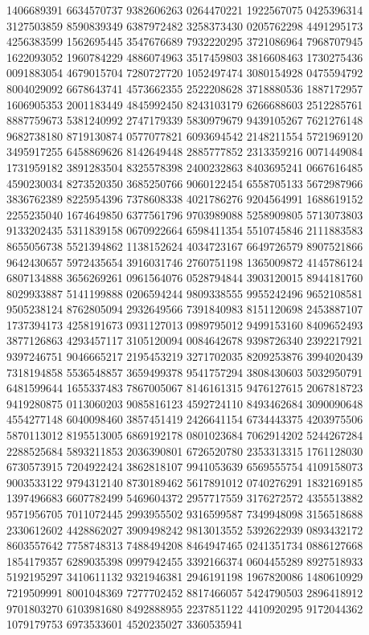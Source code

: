 {{1406689391 6634570737 9382606263 0264470221 1922567075 0425396314 3127503859
8590839349 6387972482 3258373430 0205762298 4491295173 4256383599 1562695445
3547676689 7932220295 3721086964 7968707945 1622093052 1960784229 4886074963
3517459803 3816608463 1730275436 0091883054 4679015704 7280727720 1052497474
3080154928 0475594792 8004029092 6678643741 4573662355 2522208628 3718880536
1887172957 1606905353 2001183449 4845992450 8243103179 6266688603 2512285761
8887759673 5381240992 2747179339 5830979679 9439105267 7621276148 9682738180
8719130874 0577077821 6093694542 2148211554 5721969120 3495917255 6458869626
8142649448 2885777852 2313359216 0071449084 1731959182 3891283504 8325578398
2400232863 8403695241 0667616485 4590230034 8273520350 3685250766 9060122454
6558705133 5672987966 3836762389 8225954396 7378608338 4021786276 9204564991
1688619152 2255235040 1674649850 6377561796 9703989088 5258909805 5713073803
9133202435 5311839158 0670922664 6598411354 5510745846 2111883583 8655056738
5521394862 1138152624 4034723167 6649726579 8907521866 9642430657 5972435654
3916031746 2760751198 1365009872 4145786124 6807134888 3656269261 0961564076
0528794844 3903120015 8944181760 8029933887 5141199888 0206594244 9809338555
9955242496 9652108581 9505238124 8762805094 2932649566 7391840983 8151120698
2453887107 1737394173 4258191673 0931127013 0989795012 9499153160 8409652493
3877126863 4293457117 3105120094 0084642678 9398726340 2392217921 9397246751
9046665217 2195453219 3271702035 8209253876 3994020439 7318194858 5536548857
3659499378 9541757294 3808430603 5032950791 6481599644 1655337483 7867005067
8146161315 9476127615 2067818723 9419280875 0113060203 9085816123 4592724110
8493462684 3090090648 4554277148 6040098460 3857451419 2426641154 6734443375
4203975506 5870113012 8195513005 6869192178 0801023684 7062914202 5244267284
2288525684 5893211853 2036390801 6726520780 2353313315 1761128030 6730573915
7204922424 3862818107 9941053639 6569555754 4109158073 9003533122 9794312140
8730189462 5617891012 0740276291 1832169185 1397496683 6607782499 5469604372
2957717559 3176272572 4355513882 9571956705 7011072445 2993955502 9316599587
7349948098 3156518688 2330612602 4428862027 3909498242 9813013552 5392622939
0893432172 8603557642 7758748313 7488494208 8464947465 0241351734 0886127668
1854179357 6289035398 0997942455 3392166374 0604455289 8927518933 5192195297
3410611132 9321946381 2946191198 1967820086 1480610929 7219509991 8001048369
7277702452 8817466057 5424790503 2896418912 9701803270 6103981680 8492888955
2237851122 4410920295 9172044362 1079179753 6973533601 4520235027 3360535941
}}
